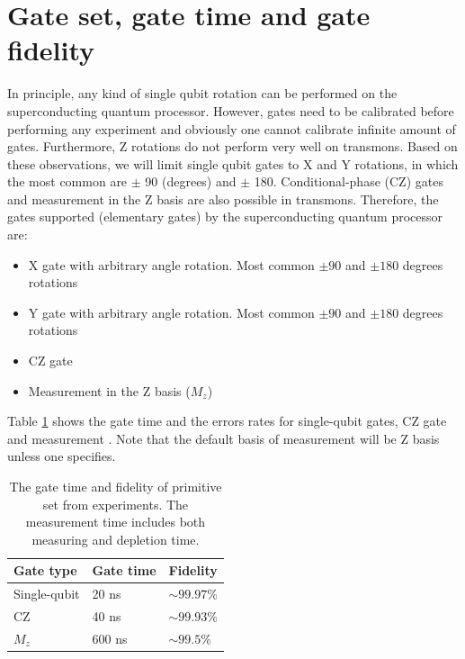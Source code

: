 \documentclass[11pt]{article}
\begin{document}


\newpage

\section{Gate set, gate time and gate fidelity}
\label{sec:orgd576c64}


In principle, any kind of single qubit rotation can be performed on the superconducting quantum processor. However, gates need to be calibrated before performing any experiment and obviously one cannot calibrate infinite amount of gates. Furthermore, Z rotations do not perform very well on transmons. Based on these observations, we will limit single qubit gates to X and Y rotations, in which the most common are  $\pm$ 90 (degrees) and $\pm$ 180. Conditional-phase (CZ) gates and measurement in the Z basis are also possible in transmons. Therefore, the gates supported (elementary gates) by the superconducting quantum processor are:

\begin{itemize}
\item X gate with arbitrary angle rotation. Most common  \(\pm 90\) and \(\pm180\) degrees rotations
\item Y gate with arbitrary angle rotation. Most common  \(\pm 90\) and \(\pm180\) degrees rotations
\item CZ gate 
\item Measurement in the Z basis ($M_{z}$)
\end{itemize}

Table \ref{primitive_gate_time} shows the gate time and the errors rates for single-qubit gates, CZ gate and measurement \cite{versluis2016scalable}. Note that the default basis of measurement will be Z basis unless one specifies.

\begin{table}[h!]
\centering
\caption{The gate time and fidelity of primitive set from experiments. The measurement time includes both measuring and depletion time.}
\label{primitive_gate_time}
\begin{tabular}{lll}
\textbf{Gate type}    & \textbf{Gate time} & \textbf{Fidelity}       \\
\hline\hline
Single-qubit & 20 ns     &  $\sim 99.97 \%$ \\
\hline

CZ           & 40 ns     & $\sim 99.93 \%$           \\
\hline
$M_{z}$  & 600 ns    & $\sim 99.5 \%$     \\  
\hline
\end{tabular}
\end{table}
\end{document}
